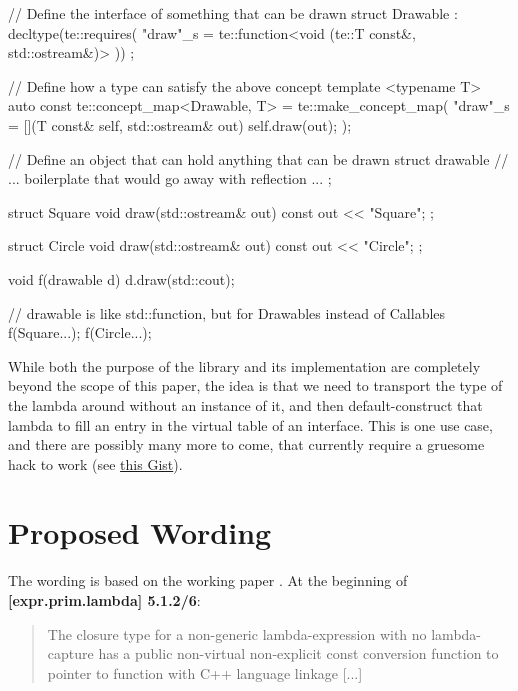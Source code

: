 \documentclass{wg21}
\begin{document}
\begin{cpp}
// Define the interface of something that can be drawn
struct Drawable : decltype(te::requires(
  "draw"_s = te::function<void (te::T const&, std::ostream&)>
)) { };

// Define how a type can satisfy the above concept
template <typename T>
auto const te::concept_map<Drawable, T> = te::make_concept_map(
  "draw"_s = [](T const& self, std::ostream& out) { self.draw(out); }
);

// Define an object that can hold anything that can be drawn
struct drawable {
  // ... boilerplate that would go away with reflection ...
};

struct Square {
  void draw(std::ostream& out) const { out << "Square"; }
};

struct Circle {
  void draw(std::ostream& out) const { out << "Circle"; }
};

void f(drawable d) {
  d.draw(std::cout);
}

// drawable is like std::function, but for Drawables instead of Callables
f(Square{...});
f(Circle{...});
\end{cpp}

While both the purpose of the library and its implementation are completely
beyond the scope of this paper, the idea is that we need to transport the
type of the lambda around without an instance of it, and then default-construct
that lambda to fill an entry in the virtual table of an interface. This is one
use case, and there are possibly many more to come, that currently require a
gruesome hack to work (see \href{https://github.com/ldionne/te/blob/1c9ed3148c7071034942516e66a12a38615e56a6/include/te/detail/empty_object.hpp#L13}{this Gist}).


\section{Proposed Wording}
The wording is based on the working paper \cite{N4606}. At the beginning of
\textbf{[expr.prim.lambda] 5.1.2/6}:

\begin{quote}
   The closure type for a
  non-generic lambda-expression with no lambda-capture has a public non-virtual
  non-explicit const conversion function to pointer to function with C++ language
  linkage [...]
\end{quote}
\end{document}
